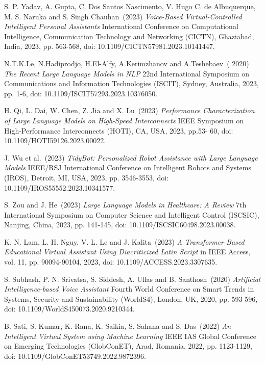 \begin{thebibliography}{999}
S. P. Yadav, A. Gupta, C. Dos Santos Nascimento, V. Hugo C. de Albuquerque, M. S. Naruka and S. Singh Chauhan~(2023)
{\it Voice-Based Virtual-Controlled Intelligent Personal Assistants} 
International Conference on Computational Intelligence, Communication Technology and Networking (CICTN), Ghaziabad, India, 2023, pp. 563-568, doi: 10.1109/CICTN57981.2023.10141447.


N.T.K.Le, N.Hadiprodjo, H.El-Alfy, A.Kerimzhanov and A.Teshebaev~( 2020)
{\it The Recent Large Language Models in NLP} 
22nd International Symposium on Communications and Information Technologies (ISCIT), Sydney, Australia, 2023, pp. 1-6, doi: 10.1109/ISCIT57293.2023.10376050.


 H. Qi, L. Dai, W. Chen, Z. Jia and X. Lu~(2023)
{\it Performance Characterization of Large Language Models on High-Speed Interconnects} 
IEEE Symposium on High-Performance Interconnects (HOTI), CA, USA, 2023, pp.53- 60, doi: 10.1109/HOTI59126.2023.00022.

J. Wu et al.~(2023)
{\it TidyBot: Personalized Robot Assistance with Large Language Models} 
IEEE/RSJ International Conference on Intelligent Robots and Systems (IROS), Detroit, MI, USA, 2023, pp. 3546-3553, doi: 10.1109/IROS55552.2023.10341577.


S. Zou and J. He~(2023)
{\it Large Language Models in Healthcare: A Review }
7th International Symposium on Computer Science and Intelligent Control (ISCSIC), Nanjing, China, 2023, pp. 141-145, doi: 10.1109/ISCSIC60498.2023.00038.


K. N. Lam, L. H. Nguy, V. L. Le and J. Kalita~(2023)
{\it A Transformer-Based Educational Virtual Assistant Using Diacriticized Latin Script}
in IEEE Access, vol. 11, pp. 90094-90104, 2023, doi: 10.1109/ACCESS.2023.3307635.

S. Subhash, P. N. Srivatsa, S. Siddesh, A. Ullas and B. Santhosh~(2020)
{\it Artificial Intelligence-based Voice Assistant}
Fourth World Conference on Smart Trends in Systems, Security and Sustainability (WorldS4), London, UK, 2020, pp. 593-596, doi: 10.1109/WorldS450073.2020.9210344.

 B. Sati, S. Kumar, K. Rana, K. Saikia, S. Sahana and S. Das~(2022)
{\it An Intelligent Virtual System using Machine Learning}
IEEE IAS Global Conference on Emerging Technologies (GlobConET), Arad, Romania, 2022, pp. 1123-1129, doi: 10.1109/GlobConET53749.2022.9872396.


\end{thebibliography}
